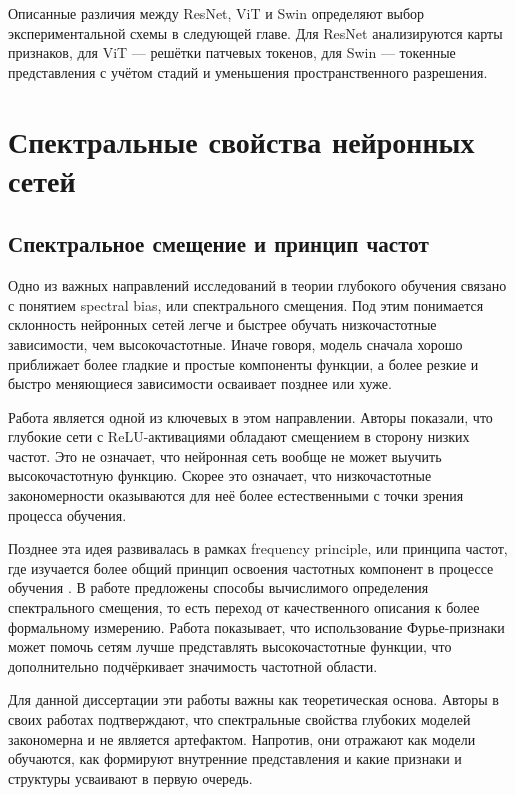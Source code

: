 Описанные различия между ResNet, ViT и Swin определяют выбор экспериментальной схемы в следующей главе. Для ResNet анализируются карты признаков, для ViT — решётки патчевых токенов, для Swin — токенные представления с учётом стадий и уменьшения пространственного разрешения.

\section{Спектральные свойства нейронных сетей}

\subsection{Спектральное смещение и принцип частот}

Одно из важных направлений исследований в теории глубокого обучения связано с понятием spectral bias, или спектрального смещения. Под этим понимается склонность нейронных сетей легче и быстрее обучать низкочастотные зависимости, чем высокочастотные. Иначе говоря, модель сначала хорошо приближает более гладкие и простые компоненты функции, а более резкие и быстро меняющиеся зависимости осваивает позднее или хуже.

Работа \cite{rahaman2019spectral} является одной из ключевых в этом направлении. Авторы показали, что глубокие сети с ReLU-активациями обладают смещением в сторону низких частот. Это не означает, что нейронная сеть вообще не может выучить высокочастотную функцию. Скорее это означает, что низкочастотные закономерности оказываются для неё более естественными с точки зрения процесса обучения.

Позднее эта идея развивалась в рамках frequency principle, или принципа частот, где изучается более общий принцип освоения частотных компонент в процессе обучения \cite{xu2025overview}. В работе \cite{kiessling2022computable} предложены способы вычислимого определения спектрального смещения, то есть переход от качественного описания к более формальному измерению. Работа \cite{tancik2020fourier} показывает, что использование Фурье-признаки может помочь сетям лучше представлять высокочастотные функции, что дополнительно подчёркивает значимость частотной области.

Для данной диссертации эти работы важны как теоретическая основа. Авторы в своих работах подтверждают, что спектральные свойства глубоких моделей закономерна и не является артефактом. Напротив, они отражают как модели обучаются, как формируют внутренние представления и какие признаки и структуры усваивают в первую очередь.


